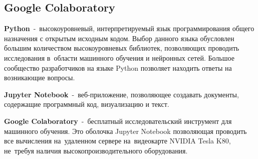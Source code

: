 \subsection{Google Colaboratory}

\textbf{Python}\cite{bib:python}~-~высокоуровневый, интерпретируемый язык программирования общего назначения с открытым исходным кодом.
Выбор данного языка обусловлен большим количеством высокоуровневых библиотек, позволяющих проводить исследования в~области машинного обучения и нейронных сетей.
Большое сообщество разработчиков на языке Python позволяет находить ответы на возникающие вопросы\cite{bib:why_python}.

\textbf{Jupyter Notebook}\cite{bib:jupyter}~-~веб-приложение, позволяющее создавать документы, содержащие программный код, визуализацию и текст.

\textbf{Google Colaboratory}\cite{bib:google_colab}\cite{bib:colab_settings}~-~бесплатный исследовательский инструмент для машинного обучения.
Это оболочка Jupyter Notebook позволяющая проводить все вычисления на~удаленном сервере на~видеокарте NVIDIA Tesla K80\cite{bib:nvidia_k80}, не~требуя наличия высокопроизводительного оборудования.




